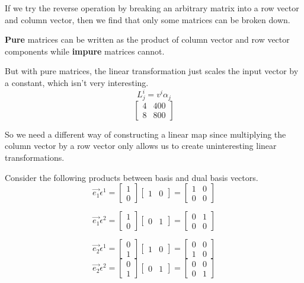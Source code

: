 \documentclass{report}
\begin{document}
If we try the reverse operation by breaking an arbitrary matrix into a row vector and column vector, then we find that only some matrices can be broken down.

\textbf{Pure} matrices can be written as the product of column vector and row vector components while \textbf{impure} matrices cannot.

But with pure matrices, the linear transformation just scales the input vector by a constant, which isn't very interesting.
$$ L_j^i = v^i \alpha_j $$ 
$$ \begin{bmatrix} 4 & 400 \\ 8 & 800 \end{bmatrix}  $$ 

So we need a different way of constructing a linear map since multiplying the column vector by a row vector only allows us to create uninteresting linear transformations.

Consider the following products between basis and dual basis vectors.
$$ \vec{e_1} \epsilon^1 = \begin{bmatrix} 1 \\ 0 \end{bmatrix} \begin{bmatrix} 1 & 0 \end{bmatrix}  = \begin{bmatrix} 1& 0 \\ 0 & 0 \end{bmatrix}  $$ 

$$ \vec{e_1} \epsilon^2  = \begin{bmatrix} 1 \\ 0 \end{bmatrix} \begin{bmatrix} 0 & 1 \end{bmatrix}  = \begin{bmatrix} 0 & 1 \\ 0 & 0 \end{bmatrix} $$ 

$$ \vec{e_2} \epsilon^1 = \begin{bmatrix} 0 \\ 1 \end{bmatrix} \begin{bmatrix} 1 & 0 \end{bmatrix} = \begin{bmatrix} 0 & 0 \\ 1 & 0 \end{bmatrix}    $$ 
$$ \vec{e_2} \epsilon^2 = \begin{bmatrix} 0 \\ 1 \end{bmatrix} \begin{bmatrix} 0 & 1 \end{bmatrix}  = \begin{bmatrix} 0 & 0 \\ 0 & 1 \end{bmatrix}  $$ 
\end{document}
